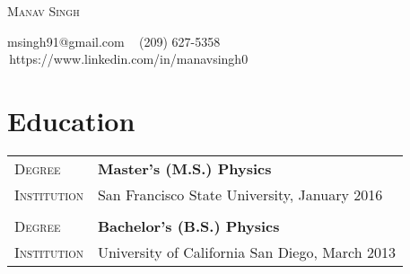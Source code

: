 \documentclass[a4paper, oneside, final]{scrartcl} %
\newcommand{\gray}{\rowcolor[gray]{.9}} %
\newcommand{\gap}{\vspace{-.25cm}}
\begin{document}

\begin{center} %


{\fontsize{30}{30}\selectfont\scshape Manav Singh} %

\vspace{.25 cm} %


{\Large\Letter} msingh91@gmail.com \ {\Large\Telefon} (209) 627-5358 \\ %
\faLinkedinSign \,https://www.linkedin.com/in/manavsingh0


\vspace{-.5 cm} %




\section{{Education}}
\gap
\begin{tabularx}{0.97\linewidth}{>{\raggedright\scshape}p{3cm}X}
\gray Degree & \textbf{Master's (M.S.) Physics} \\
\gray Institution & {San Francisco State University, January 2016} \\
\\[-.25cm]
\gray Degree & \textbf{Bachelor's (B.S.) Physics} \\
\gray Institution & {University of California San Diego, March 2013} \\
\end{tabularx}


\end{center}
\end{document}
